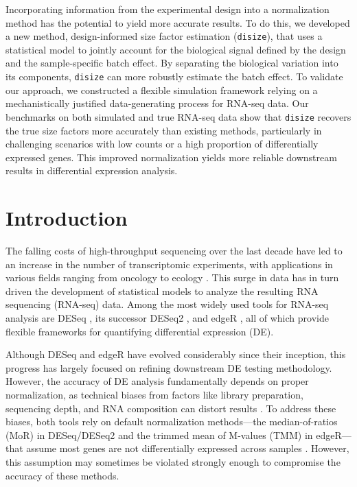 \documentclass[10pt,letterpaper]{article}
\begin{document}
Incorporating information from the experimental design into a normalization method has the potential to yield more accurate results. 
To do this, we developed a new method, design-informed size factor estimation (\texttt{disize}), that uses a statistical model to jointly account for the biological signal defined by the design and the sample-specific batch effect. 
By separating the biological variation into its components, \texttt{disize} can more robustly estimate the batch effect. 
To validate our approach, we constructed a flexible simulation framework relying on a mechanistically justified data-generating process for RNA-seq data.
Our benchmarks on both simulated and true RNA-seq data show that \texttt{disize} recovers the true size factors more accurately than existing methods, particularly in challenging scenarios with low counts or a high proportion of differentially expressed genes. 
This improved normalization yields more reliable downstream results in differential expression analysis.

\linenumbers

\section*{Introduction}
The falling costs of high-throughput sequencing over the last decade have led to an increase in the number of transcriptomic experiments, with applications in various fields ranging from oncology \cite{hong_rna_2020} to ecology \cite{todd_power_2016}. 
This surge in data has in turn driven the development of statistical models to analyze the resulting RNA sequencing (RNA-seq) data. 
Among the most widely used tools for RNA-seq analysis are DESeq \cite{anders_differential_2010}, its successor DESeq2 \cite{love_moderated_2014}, and edgeR \cite{robinson_edger_2010}, all of which provide flexible frameworks for quantifying differential expression (DE).

Although DESeq and edgeR have evolved considerably since their inception, this progress has largely focused on refining downstream DE testing methodology.
However, the accuracy of DE analysis fundamentally depends on proper normalization, as technical biases from factors like library preparation, sequencing depth, and RNA composition can distort results \cite{robinson_scaling_2010}. 
To address these biases, both tools rely on default normalization methods---the median-of-ratios (MoR) \cite{anders_differential_2010} in DESeq/DESeq2 and the trimmed mean of M-values (TMM) \cite{robinson_scaling_2010} in edgeR---that assume most genes are not differentially expressed across samples \cite{anders_differential_2010,robinson_scaling_2010}. 
However, this assumption may sometimes be violated strongly enough to compromise the accuracy of these methods.
\end{document}
